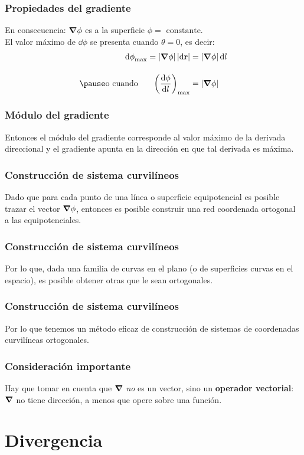 \documentclass[12pt]{beamer}
\begin{document}
\begin{frame}
\frametitle{Propiedades del gradiente}
En consecuencia: $\grad{\phi}$ es  a la superficie $\phi = \text{ constante}$.
\\
\bigskip
\pause
El valor máximo de $\dd{\phi}$ se presenta cuando $\theta = 0$, es decir:
\pause
\begin{eqnarray*}
\begin{aligned}
\dd{\phi}_{\max} = \abs{\grad{\phi}} \, \abs{\dd{\vb{r}}} &= \abs{\grad{\phi}} \dd{l} \\[1em] \pause
\text{o cuando } \hspace{0.5cm} \left( \dv{\phi}{l} \right)_{\max} &= \abs{\grad{\phi}}
\end{aligned}
\end{eqnarray*}
\end{frame}
\begin{frame}
\frametitle{Módulo del gradiente}
Entonces el módulo del gradiente corresponde al valor máximo de la derivada direccional y el gradiente apunta en la dirección en que tal derivada es máxima.
\end{frame}
\begin{frame}
\frametitle{Construcción de sistema curvilíneos}
Dado que para cada punto de una línea o superficie equipotencial es posible trazar el vector $\grad{\phi}$, entonces es posible construir una red coordenada ortogonal a las equipotenciales.
\end{frame}
\begin{frame}
\frametitle{Construcción de sistema curvilíneos}
Por lo que, dada una familia de curvas en el plano (o de superficies curvas en el espacio), es posible obtener otras que le sean ortogonales.
\end{frame}
\begin{frame}
\frametitle{Construcción de sistema curvilíneos}
Por lo que tenemos un método eficaz de construcción de sistemas de coordenadas curvilíneas ortogonales.
\end{frame}
\begin{frame}
\frametitle{Consideración importante}
Hay que tomar en cuenta que $\grad$ \emph{no} es un vector, \pause sino un \textbf{operador vectorial}: $\grad$ no tiene dirección, a menos que opere sobre una función.
\end{frame}

\section{Divergencia}
\end{document}
